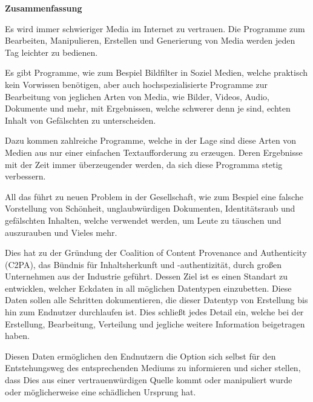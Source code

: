 \thispagestyle{empty}
\vspace*{0.2cm}

\begin{center}
    \textbf{Zusammenfassung}
\end{center}

\vspace*{0.2cm}

\noindent 

Es wird immer schwieriger Media im Internet zu vertrauen. Die Programme zum Bearbeiten, Manipulieren, Erstellen und Generierung von Media werden jeden Tag leichter zu bedienen.

Es gibt Programme, wie zum Bespiel Bildfilter in Soziel Medien, welche praktisch kein Vorwissen benötigen, aber auch hochspezialisierte Programme zur Bearbeitung von jeglichen Arten von Media, wie Bilder, Videos, Audio, Dokumente und mehr, mit Ergebnissen, welche schwerer denn je sind, echten Inhalt von Gefälschten zu unterscheiden.

Dazu kommen zahlreiche Programme, welche in der Lage sind diese Arten von Medien aus nur einer einfachen Textaufforderung zu erzeugen. Deren Ergebnisse mit der Zeit immer überzeugender werden, da sich diese Programma stetig verbessern.

All das führt zu neuen Problem in der Gesellschaft, wie zum Bespiel eine falsche Vorstellung von Schönheit, unglaubwürdigen Dokumenten, Identitätsraub und gefälschten Inhalten, welche verwendet werden, um Leute zu täuschen und auszurauben und Vieles mehr.

Dies hat zu der Gründung der Coalition of Content Provenance and Authenticity (C2PA), das Bündnis für Inhaltsherkunft und -authentizität, durch großen Unternehmen aus der Industrie geführt. Dessen Ziel ist es einen Standart zu entwicklen, welcher Eckdaten in all möglichen Datentypen einzubetten. Diese Daten sollen alle Schritten dokumentieren, die dieser Datentyp von Erstellung bis hin zum Endnutzer durchlaufen ist. Dies schließt jedes Detail ein, welche bei der Erstellung, Bearbeitung, Verteilung und jegliche weitere Information beigetragen haben.

Diesen Daten ermöglichen den Endnutzern die Option sich selbst für den Entstehungsweg des entsprechenden Mediums zu informieren und sicher stellen, dass Dies aus einer vertrauenwürdigen Quelle kommt oder manipuliert wurde oder möglicherweise eine schädlichen Ursprung hat.